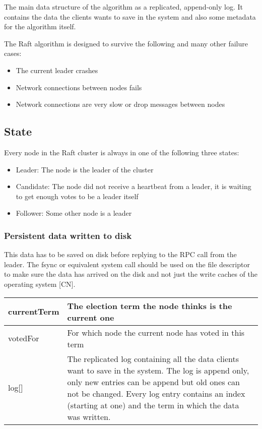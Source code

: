 The main data structure of the algorithm as a replicated, append-only log. It contains the data the clients wants to save in the system and also some metadata
for the algorithm itself.

The Raft algorithm is designed to survive the following and many other failure cases:
\begin{itemize}
    \item The current leader crashes
    \item Network connections between nodes fails
    \item Network connections are very slow or drop messages between nodes
\end{itemize}

\subsection{State}
Every node in the Raft cluster is always in one of the following three states:
\begin{itemize}
    \item Leader: The node is the leader of the cluster
    \item Candidate: The node did not receive a heartbeat from a leader, it is waiting to get enough votes to be a leader itself
    \item Follower: Some other node is a leader
\end{itemize}

\subsubsection*{Persistent data written to disk}

This data has to be saved on disk before replying to the RPC call from the leader. The fsync or equivalent system call should be used on the file descriptor to make sure the data has arrived on the disk and not just the write caches of the operating system [CN].

\begin{tabular}{ | l | p{13.7cm} | }
\hline
currentTerm & The election term the node thinks is the current one \\ \hline
votedFor & For which node the current node has voted in this term \\ \hline
log[] & The replicated log containing all the data clients want to save in the system. The log is append only, only new entries can be append but old ones can not be changed.
Every log entry contains an index (starting at one) and the term in which the data was written. \\ \hline
\end{tabular}

